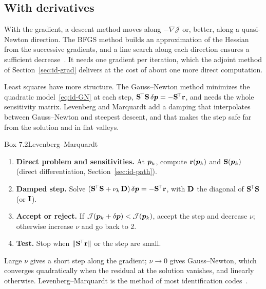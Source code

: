 \subsection{With derivatives}
%
With the gradient, a descent method moves along $-\nabla\mathcal J$ or, better,
along a quasi-Newton direction. The BFGS method builds an approximation of the
Hessian from the successive gradients, and a line search along each direction
ensures a sufficient decrease~\cite{NocedalWright2006}. It needs one gradient per
iteration, which the adjoint method of Section~\ref{sec:id-grad} delivers at
the cost of about one more direct computation.

Least squares have more structure. The Gauss--Newton method minimizes the
quadratic model~\eqref{eq:id-GN} at each step,
$\mathbf{S}^{\!\top}\mathbf{S}\,\delta\bm{p}=-\mathbf{S}^{\!\top}\mathbf{r}$, and needs the whole sensitivity
matrix. Levenberg and Marquardt add a damping that interpolates between
Gauss--Newton and steepest descent, and that makes the step safe far from the
solution and in flat valleys.

\begin{gbox}{Box 7.2\quad Levenberg--Marquardt}
%
\begin{enumerate}[label=\textbf{\arabic*.},leftmargin=1.6em]
  \item \textbf{Direct problem and sensitivities.} At $\bm{p}_k$, compute
  $\mathbf{r}(\bm{p}_k)$ and $\mathbf{S}(\bm{p}_k)$ (direct differentiation,
  Section~\ref{sec:id-path}).
  \item \textbf{Damped step.} Solve
  $(\mathbf{S}^{\!\top}\mathbf{S}+\nu_k\,\mathbf{D})\,\delta\bm{p}=-\mathbf{S}^{\!\top}\mathbf{r}$, with $\mathbf{D}$ the
  diagonal of $\mathbf{S}^{\!\top}\mathbf{S}$ (or $\mathbf{I}$).
  \item \textbf{Accept or reject.} If $\mathcal J(\bm{p}_k+\delta\bm{p})<\mathcal J(\bm{p}_k)$,
  accept the step and decrease $\nu$; otherwise increase $\nu$ and go back to 2.
  \item \textbf{Test.} Stop when $\lVert \mathbf{S}^{\!\top}\mathbf{r}\rVert$ or the step are small.
\end{enumerate}
\end{gbox}
\noindent Large $\nu$ gives a short step along the gradient; $\nu\to0$ gives
Gauss--Newton, which converges quadratically when the residual at the solution
vanishes, and linearly otherwise. Levenberg--Marquardt is the method of most
identification codes~\cite{MahnkenStein1996,LecampionConstantinescuNguyen2002}.

